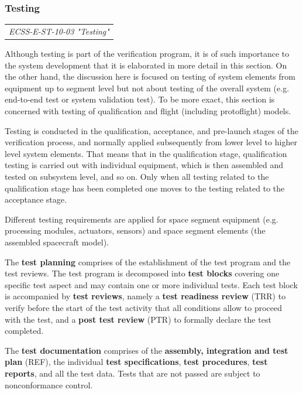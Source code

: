 \subsubsection{Testing}

\begin{tabular}{l}
\textit{ECSS-E-ST-10-03 "Testing" \cite{ECSS-E-ST-10-03}}
\end{tabular}

Although testing is part of the verification program, it is of such importance to the system development that it is elaborated in more detail in this section. On the other hand, the discussion here is focused on testing of system elements from equipment up to segment level but not about testing of the overall system (e.g. end-to-end test or system validation test). To be more exact, this section is concerned with testing of qualification and flight (including protoflight) models.

Testing is conducted in the qualification, acceptance, and pre-launch stages of the verification process, and normally applied subsequently from lower level to higher level system elements. That means that in the qualification stage, qualification testing is carried out with individual equipment, which is then assembled and tested on subsystem level, and so on. Only when all testing related to the qualification stage has been completed one moves to the testing related to the acceptance stage.

Different testing requirements are applied for space segment equipment (e.g. processing modules, actuators, sensors) and space segment elements (the assembled spacecraft model). 

The \textbf{test planning} comprises of the establishment of the test program and the test reviews. The test program is decomposed into \textbf{test blocks} covering one specific test aspect and may contain one or more individual tests. Each test block is accompanied by \textbf{test reviews}, namely a \textbf{test readiness review} (TRR) to verify before the start of the test activity that all conditions allow to proceed with the test, and a \textbf{post test review} (PTR) to formally declare the test completed. 

The \textbf{test documentation} comprises of the \textbf{assembly, integration and test plan} (REF), the individual \textbf{test specifications}, \textbf{test procedures}, \textbf{test reports}, and all the test data. Tests that are not passed are subject to nonconformance control.
 
